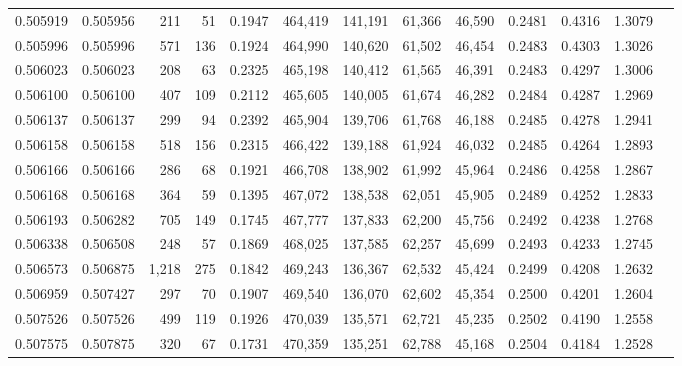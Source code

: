 \begin{tabular}{rrrrrrrrrrrrr}
0.505919 & 0.505956 &   211 &    51 &                                     0.1947 & 464,419 & 141,191 &  61,366 &  46,590 & 0.2481 & 0.4316 & 1.3079 \\
0.505996 & 0.505996 &   571 &   136 &                                     0.1924 & 464,990 & 140,620 &  61,502 &  46,454 & 0.2483 & 0.4303 & 1.3026 \\
0.506023 & 0.506023 &   208 &    63 &                                     0.2325 & 465,198 & 140,412 &  61,565 &  46,391 & 0.2483 & 0.4297 & 1.3006 \\
0.506100 & 0.506100 &   407 &   109 &                                     0.2112 & 465,605 & 140,005 &  61,674 &  46,282 & 0.2484 & 0.4287 & 1.2969 \\
0.506137 & 0.506137 &   299 &    94 &                                     0.2392 & 465,904 & 139,706 &  61,768 &  46,188 & 0.2485 & 0.4278 & 1.2941 \\
0.506158 & 0.506158 &   518 &   156 &                                     0.2315 & 466,422 & 139,188 &  61,924 &  46,032 & 0.2485 & 0.4264 & 1.2893 \\
0.506166 & 0.506166 &   286 &    68 &                                     0.1921 & 466,708 & 138,902 &  61,992 &  45,964 & 0.2486 & 0.4258 & 1.2867 \\
0.506168 & 0.506168 &   364 &    59 &                                     0.1395 & 467,072 & 138,538 &  62,051 &  45,905 & 0.2489 & 0.4252 & 1.2833 \\
0.506193 & 0.506282 &   705 &   149 &                                     0.1745 & 467,777 & 137,833 &  62,200 &  45,756 & 0.2492 & 0.4238 & 1.2768 \\
0.506338 & 0.506508 &   248 &    57 &                                     0.1869 & 468,025 & 137,585 &  62,257 &  45,699 & 0.2493 & 0.4233 & 1.2745 \\
0.506573 & 0.506875 & 1,218 &   275 &                                     0.1842 & 469,243 & 136,367 &  62,532 &  45,424 & 0.2499 & 0.4208 & 1.2632 \\
0.506959 & 0.507427 &   297 &    70 &                                     0.1907 & 469,540 & 136,070 &  62,602 &  45,354 & 0.2500 & 0.4201 & 1.2604 \\
0.507526 & 0.507526 &   499 &   119 &                                     0.1926 & 470,039 & 135,571 &  62,721 &  45,235 & 0.2502 & 0.4190 & 1.2558 \\
0.507575 & 0.507875 &   320 &    67 &                                     0.1731 & 470,359 & 135,251 &  62,788 &  45,168 & 0.2504 & 0.4184 & 1.2528 \\

\end{tabular}
